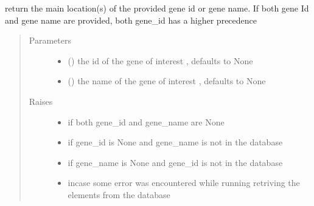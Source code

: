 \documentclass[letterpaper,10pt,english]{sphinxmanual}
\begin{document}
\begin{fulllineitems}
\begin{fulllineitems}
\label{\detokenize{IPTK.Classes:IPTK.Classes.Database.CellularLocationDB.get_main_location}}
return the main location(s) of the provided gene id or gene name. 
If both gene Id and gene name are provided, both gene\_id has a higher precedence
\begin{quote}\begin{description}
\item[{Parameters}] \leavevmode\begin{itemize}
\item {} 
 (\sphinxstyleliteralemphasis{\sphinxupquote{, }}) \textendash{} the id of the gene of interest , defaults to None

\item {} 
 (\sphinxstyleliteralemphasis{\sphinxupquote{{[}}}\sphinxstyleliteralemphasis{\sphinxupquote{{]}}}\sphinxstyleliteralemphasis{\sphinxupquote{, }}) \textendash{} the name of the gene of interest , defaults to None

\end{itemize}

\item[{Raises}] \leavevmode\begin{itemize}
\item {} 
 \textendash{} if both gene\_id and gene\_name are None

\item {} 
 \textendash{} if gene\_id is None and gene\_name is not in the database

\item {} 
 \textendash{} if gene\_name is None and gene\_id is not in the database

\item {} 
 \textendash{} incase some error was encountered while running retriving the elements from the database


\end{itemize}
\end{description}
\end{quote}
\end{fulllineitems}
\end{fulllineitems}
\end{document}
